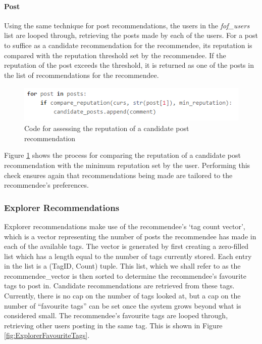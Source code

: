 \paragraph{Post} Using the same technique for post recommendations, the users in the \textit{fof\_users} list are looped through, retrieving the posts made by each of the  users. For a post to suffice as a candidate recommendation for the recommendee, its reputation is compared with the reputation threshold set by the recommendee. If the reputation of the post exceeds the threshold, it is returned as one of the posts in the list of recommendations for the recommendee.

\begin{figure}[H]
\centering
\includegraphics[height=0.7in]{Images/Implementation/FOFPostReputation}
\caption{Code for assessing the reputation of a candidate post recommendation}
\label{fig:FOFPostReputation}
\end{figure} 

\noindent Figure \ref{fig:FOFPostReputation} shows the process for comparing the reputation of a candidate post recommendation with the minimum reputation set by the user. Performing this check ensures again that recommendations being made are tailored to the recommendee's preferences.

\subsubsection{Explorer Recommendations}
Explorer recommendations make use of the recommendee's `tag count vector', which is a vector representing the number of posts the recommendee has made in each of the available tags. The vector is generated by first creating a zero-filled list which has a length equal to the number of tags currently stored. Each entry in the list is a (TagID, Count) tuple. This list, which we shall refer to as the recommendee\_vector is then sorted to determine the recommendee's favourite tags to post in. Candidate recommendations are retrieved from these tags. Currently, there is no cap on the number of tags looked at, but a cap on the number of ``favourite tags'' can be set once the system grows beyond what is considered small. The recommendee's favourite tags are looped through, retrieving other users posting in the same tag. This is shown in Figure \ref{fig:ExplorerFavouriteTags}.

